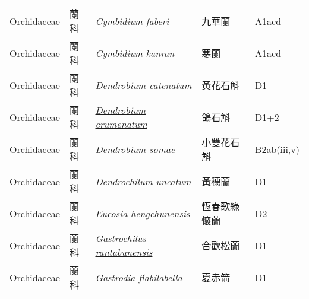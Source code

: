 {\begin{longtable}{L{2.5cm}L{2cm}L{5cm}L{2.5cm}L{3cm}}
    Orchidaceae & 蘭科 & \href{http://www.theplantlist.org/tpl1.1/search?q=Cymbidium+faberi}{\textit{Cymbidium faberi} } & 九華蘭 & A1acd    \\
    Orchidaceae & 蘭科 & \href{http://www.theplantlist.org/tpl1.1/search?q=Cymbidium+kanran}{\textit{Cymbidium kanran} } & 寒蘭 & A1acd    \\
    Orchidaceae & 蘭科 & \href{http://www.theplantlist.org/tpl1.1/search?q=Dendrobium+catenatum}{\textit{Dendrobium catenatum} } & 黃花石斛 & D1    \\
    Orchidaceae & 蘭科 & \href{http://www.theplantlist.org/tpl1.1/search?q=Dendrobium+crumenatum}{\textit{Dendrobium crumenatum} } & 鴿石斛 & D1+2    \\
    Orchidaceae & 蘭科 & \href{http://www.theplantlist.org/tpl1.1/search?q=Dendrobium+somae}{\textit{Dendrobium somae} } & 小雙花石斛 & B2ab(iii,v)    \\
    Orchidaceae & 蘭科 & \href{http://www.theplantlist.org/tpl1.1/search?q=Dendrochilum+uncatum}{\textit{Dendrochilum uncatum} } & 黃穗蘭 & D1    \\
    Orchidaceae & 蘭科 & \href{http://www.theplantlist.org/tpl1.1/search?q=Eucosia+hengchunensis}{\textit{Eucosia hengchunensis} } & 恆春歌綠懷蘭 & D2    \\
    Orchidaceae & 蘭科 & \href{http://www.theplantlist.org/tpl1.1/search?q=Gastrochilus+rantabunensis}{\textit{Gastrochilus rantabunensis} } & 合歡松蘭 & D1    \\
    Orchidaceae & 蘭科 & \href{http://www.theplantlist.org/tpl1.1/search?q=Gastrodia+flabilabella}{\textit{Gastrodia flabilabella} } & 夏赤箭 & D1    \\

\end{longtable}}
